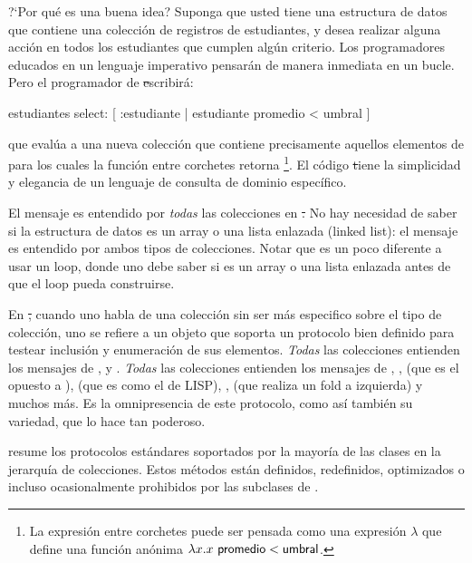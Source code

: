 \documentclass[a4paper,10pt,twoside]{book}
\begin{document}
?`Por qu\'e es una buena idea?
Suponga que usted tiene una estructura de datos que contiene una colecci\'on de registros de estudiantes, y desea realizar alguna acci\'on en todos los estudiantes que cumplen alg\'un criterio. Los programadores educados en un lenguaje imperativo pensar\'an de manera inmediata en un bucle. Pero el programador de \st escribir\'a:

\begin{code}{}
	estudiantes select: [ :estudiante | estudiante promedio < umbral ]
\end{code}
\noindent
que eval\'ua a una nueva colecci\'on que contiene precisamente aquellos elementos de  para los cuales la funci\'on entre corchetes retorna \footnote{La expresi\'on entre corchetes puede ser pensada como una expresi\'on $\lambda$ que define una funci\'on an\'onima $\lambda x. x~{\sf promedio} < {\sf umbral}$.
}.
El c\'odigo \st tiene la simplicidad y elegancia de un lenguaje de consulta de dominio espec\'ifico.

El mensaje  es entendido por \emph{todas} las colecciones en \st.  No hay necesidad de saber si la estructura de datos es un array o una lista enlazada (linked list): el mensaje  es entendido por ambos tipos de colecciones.  Notar que es un poco diferente a usar un loop, donde uno debe saber si  es un array o una lista enlazada antes de que el loop pueda construirse.

En \st, cuando uno habla de una colecci\'on sin ser m\'as especifico sobre el tipo de colecci\'on, uno se refiere a un objeto que soporta un protocolo bien definido para testear inclusi\'on y enumeraci\'on de sus elementos.  \emph{Todas} las colecciones entienden los mensajes de  \mbox{,}  y \mbox{.}  \emph{Todas} las colecciones entienden los mensajes de  , ,  (que es el opuesto a ),  (que es como el  de LISP), ,  (que realiza un fold a izquierda) y muchos m\'as.
Es la omnipresencia de este protocolo, como as\'i tambi\'en su variedad, que lo hace tan poderoso.

 resume los protocolos est\'andares soportados por la mayor\'ia de las clases en la jerarqu\'ia de colecciones.
Estos m\'etodos est\'an definidos, redefinidos, optimizados o incluso ocasionalmente prohibidos por las subclases de .
\end{document}
